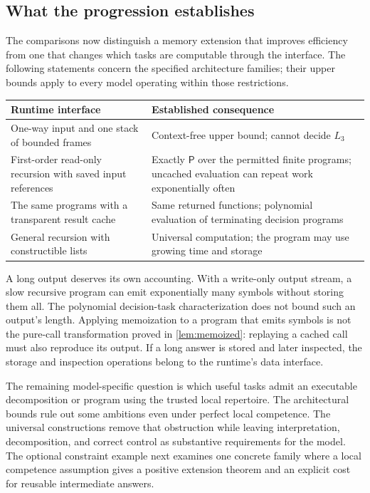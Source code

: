 \documentclass[11pt,twoside]{article}
\theoremstyle{definition}
\theoremstyle{remark}
\begin{document}
\subsection{What the progression establishes}

The comparisons now distinguish a memory extension that improves efficiency
from one that changes which tasks are computable through the interface.
The following statements concern the specified architecture families;
their upper bounds apply to every model operating within those restrictions.
\begin{center}
\small
\renewcommand{\arraystretch}{1.2}
\begin{tabular}{p{}p{}}
\toprule
Runtime interface & Established consequence \\
\midrule
One-way input and one stack of bounded frames & Context-free upper bound;
cannot decide $L_3$ \\
First-order read-only recursion with saved input references & Exactly
$\mathsf P$ over the permitted finite programs; uncached evaluation can
repeat work exponentially often \\
The same programs with a transparent result cache & Same returned
functions; polynomial evaluation of terminating decision programs \\
General recursion with constructible lists & Universal computation;
the program may use growing time and storage \\
\bottomrule
\end{tabular}
\end{center}

A long output deserves its own accounting. With a write-only output
stream, a slow recursive program can emit exponentially many symbols
without storing them all. The polynomial decision-task characterization
does not bound such an output's length. Applying memoization to a program
that emits symbols is not the pure-call transformation proved in
\cref{lem:memoized}: replaying a cached call must also reproduce its output.
If a long answer is stored and later inspected, the storage and inspection
operations belong to the runtime's data interface.

The remaining model-specific question is which useful tasks admit an
executable decomposition or program using the trusted local repertoire.
The architectural bounds rule out some ambitions even under perfect local
competence. The universal constructions remove that obstruction while
leaving interpretation, decomposition, and correct control as substantive
requirements for the model. The optional constraint example next examines
one concrete family where a local competence assumption gives a positive
extension theorem and an explicit cost for reusable intermediate answers.
\end{document}
